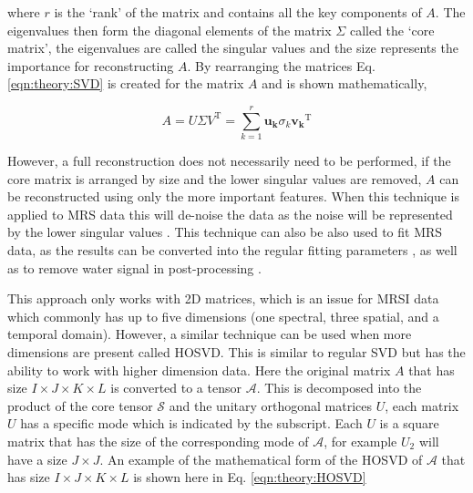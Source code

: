 
\noindent where $r$ is the `rank' of the matrix and contains all the key components of $A$. The eigenvalues then form the diagonal elements of the matrix $\Sigma$ called the `core matrix', the eigenvalues are called the singular values and the size represents the importance for reconstructing $A$. By rearranging the matrices Eq. \ref{eqn:theory:SVD} is created for the matrix $A$ \cite{Strang2016TheDecomposition} and is shown mathematically,

\begin{equation}
    A = U\Sigma V^\textrm{T} = \sum_{k=1}^{r} \mathbf{u_k}\sigma_k\mathbf{v_k}^\textrm{T}
    \label{eqn:theory:SVD}
\end{equation}

\noindent However, a full reconstruction does not necessarily need to be performed, if the core matrix is arranged by size and the lower singular values are removed, $A$ can be reconstructed using only the more important features. When this technique is applied to \ac{MRS} data this will de-noise the data as the noise will be represented by the lower singular values \cite{Brender2019DynamicHyperpolarization}. This technique can also be also used to fit \ac{MRS} data, as the results can be converted into the regular fitting parameters \cite{Pijnappel1992SVD-basedSignals}, as well as to remove water signal in post-processing \cite{Cabanes2001OptimizationBrain}.

This approach only works with 2D matrices, which is an issue for \ac{MRSI} data which commonly has up to five dimensions (one spectral, three spatial, and a temporal domain). However, a similar technique can be used when more dimensions are present called \ac{HOSVD}. This is similar to regular \ac{SVD} but has the ability to work with higher dimension data. Here the original matrix $A$ that has size $I \times J \times K \times L$ is converted to a tensor $\mathcal{A}$. This is decomposed into the product of the core tensor $\mathcal{S}$ and the unitary orthogonal matrices $U$, each matrix $U$ has a specific mode which is indicated by the subscript. Each $U$ is a square matrix that has the size of the corresponding mode of $\mathcal{A}$, for example $U_2$ will have a size $J \times J$. An example of the mathematical form of the \ac{HOSVD} of $\mathcal{A}$ that has size $I \times J \times K \times L$ is shown here in Eq. \ref{eqn:theory:HOSVD}

